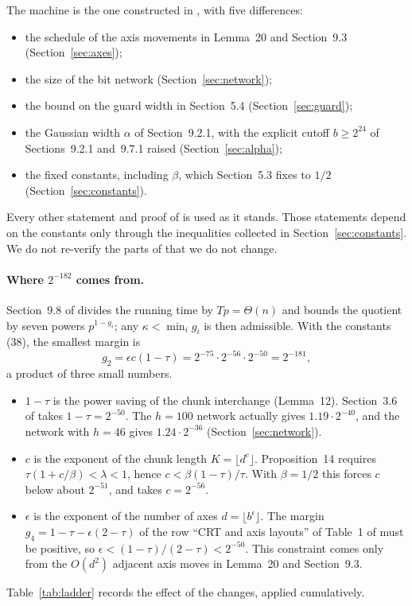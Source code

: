 \documentclass[11pt]{article}
\numberwithin{equation}{section}
\numberwithin{table}{section}
\theoremstyle{remark}
\newcommand{\OAI}{\cite{OAI}}
\begin{document}
The machine is the one constructed in \OAI, with five differences:
\begin{itemize}
\item the schedule of the axis movements in Lemma~20 and Section~9.3
(Section~\ref{sec:axes});
\item the size of the bit network (Section~\ref{sec:network});
\item the bound on the guard width in Section~5.4
(Section~\ref{sec:guard});
\item the Gaussian width $\alpha$ of Section~9.2.1, with the explicit
cutoff $b\ge2^{24}$ of Sections~9.2.1 and~9.7.1 raised
(Section~\ref{sec:alpha});
\item the fixed constants, including $\beta$, which Section~5.3 fixes
to $1/2$ (Section~\ref{sec:constants}).
\end{itemize}
Every other statement and proof of \OAI{} is used as it stands. Those
statements depend on the constants only through the inequalities
collected in Section~\ref{sec:constants}. We do not re-verify the parts
of \OAI{} that we do not change.

\paragraph{Where $2^{-182}$ comes from.}
Section~9.8 of \OAI{} divides the running time by $Tp=\Theta(n)$ and
bounds the quotient by seven powers $p^{1-g_i}$; any $\kappa<\min_i g_i$
is then admissible. With the constants (38), the smallest margin is
\[
 g_2=\epsilon c(1-\tau)=2^{-75}\cdot2^{-56}\cdot2^{-50}=2^{-181},
\]
a product of three small numbers.
\begin{itemize}
\item $1-\tau$ is the power saving of the chunk interchange
(Lemma~12). Section~3.6 of \OAI{} takes $1-\tau=2^{-50}$. The $h=100$
network actually gives $1.19\cdot2^{-40}$, and the network with $h=46$
gives $1.24\cdot2^{-36}$ (Section~\ref{sec:network}).
\item $c$ is the exponent of the chunk length $K=\lfloor d^c\rfloor$.
Proposition~14 requires $\tau(1+c/\beta)<\lambda<1$, hence
$c<\beta(1-\tau)/\tau$. With $\beta=1/2$ this forces $c$ below about
$2^{-51}$, and \OAI{} takes $c=2^{-56}$.
\item $\epsilon$ is the exponent of the number of axes
$d=\lfloor b^\epsilon\rfloor$. The margin $g_4=1-\tau-\epsilon(2-\tau)$
of the row ``CRT and axis layouts'' of Table~1 of \OAI{} must be positive, so
$\epsilon<(1-\tau)/(2-\tau)<2^{-50}$. This constraint comes only from the
$O(d^2)$ adjacent axis moves in Lemma~20 and Section~9.3.
\end{itemize}
Table~\ref{tab:ladder} records the effect of the changes, applied
cumulatively.
\end{document}
